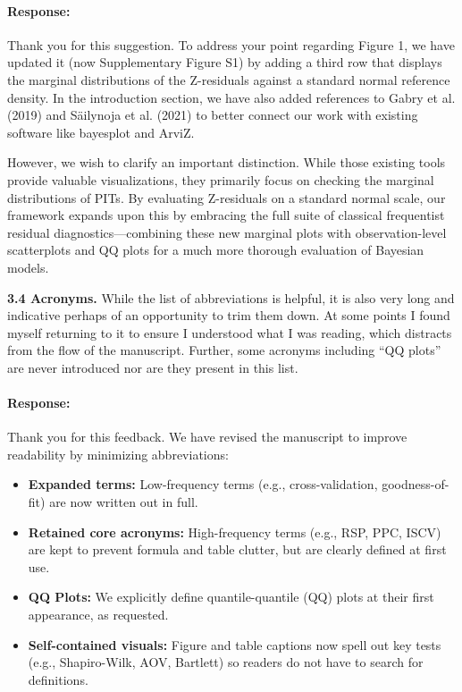 \documentclass[11pt]{article}
\newcommand*{\mybox}[2]{%
  \par\medskip\noindent
  \colorbox{#1!30}{\parbox{.98\linewidth}{#2}}%
  \par\medskip
}
\begin{document}
\paragraph{Response:}

Thank you for this suggestion. To address your point regarding Figure 1, we have updated it (now Supplementary Figure S1) by adding a third row that displays the marginal distributions of the Z-residuals against a standard normal reference density. In the introduction section, we have also added references to Gabry et al. (2019) and Säilynoja et al. (2021) to better connect our work with existing software like bayesplot and ArviZ. 

However, we wish to clarify an important distinction. While those existing tools provide valuable visualizations, they primarily focus on checking the marginal distributions of PITs. By evaluating Z-residuals on a standard normal scale, our framework expands upon this by embracing the full suite of classical frequentist residual diagnostics—combining these new marginal plots with observation-level scatterplots and QQ plots for a much more thorough evaluation of Bayesian models.




\mybox{gray}{\textbf{3.4 Acronyms.} While the list of abbreviations is helpful, it is also very long and indicative perhaps of an opportunity to trim them down. At some points I found myself returning to it to ensure I understood what I was reading, which distracts from the flow of the manuscript. Further, some acronyms including ``QQ plots'' are never introduced nor are they present in this list.}

\paragraph{Response:}
Thank you for this feedback. We have revised the manuscript to improve readability by minimizing abbreviations:
\begin{itemize}
    \item \textbf{Expanded terms:} Low-frequency terms (e.g., cross-validation, goodness-of-fit) are now written out in full.
    \item \textbf{Retained core acronyms:} High-frequency terms (e.g., RSP, PPC, ISCV) are kept to prevent formula and table clutter, but are clearly defined at first use.
    \item \textbf{QQ Plots:} We explicitly define quantile-quantile (QQ) plots at their first appearance, as requested.
    \item \textbf{Self-contained visuals:} Figure and table captions now spell out key tests (e.g., Shapiro-Wilk, AOV, Bartlett) so readers do not have to search for definitions.
\end{itemize}
\end{document}
